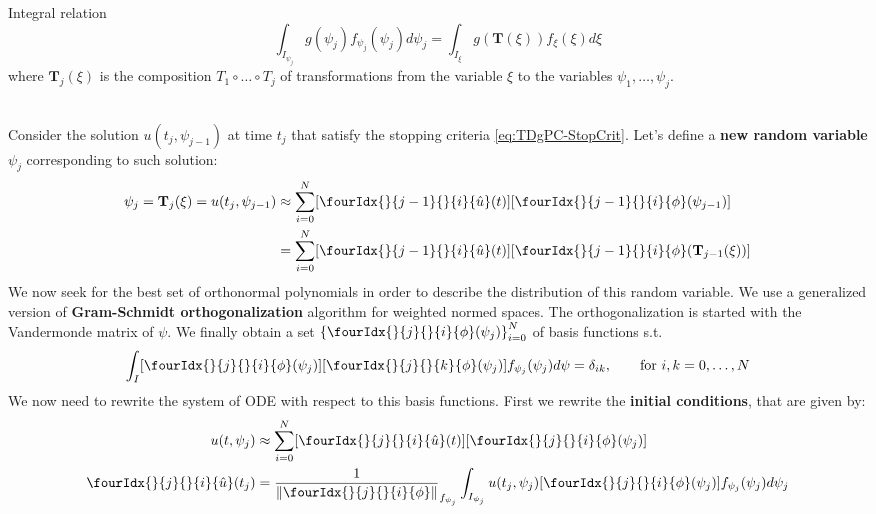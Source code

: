 \documentclass[a4paper,10pt]{article}
\begin{document}
Integral relation
\begin{equation}\label{eq:TDgPC-IntegralRelation}
	\int_{I_{\psi_j}} g(\psi_j)f_{\psi_j}(\psi_j) d\psi_j = \int_{I_\xi} g(\mathbf{T}(\xi))f_\xi(\xi) d\xi
\end{equation}
where $ \mathbf{T}_j(\xi) $ is the composition $ T_1 \circ \dots \circ T_j $ of transformations from the variable $\xi$ to the variables $\psi_1,\dots,\psi_j$.

\begin{exa}
\mbox{}\\
Consider the solution $ u(t_j,\psi_{j-1}) $ at time $t_j$ that satisfy the stopping criteria \eqref{eq:TDgPC-StopCrit}. Let's define a \textbf{new random variable} $\psi_j$ corresponding to such solution:
\begin{align}
	\psi_j = \mathbf{T}_j(\xi) = u(t_j, \psi_{j-1}) &\approx \sum_{i=0}^N [\fourIdx{}{j-1}{}{i}{\hat{u}}(t)] [\fourIdx{}{j-1}{}{i}{\phi}(\psi_{j-1})] \\
	&= \sum_{i=0}^N [\fourIdx{}{j-1}{}{i}{\hat{u}}(t)][\fourIdx{}{j-1}{}{i}{\phi}(\mathbf{T}_{j-1}(\xi))] \notag
\end{align}
We now seek for the best set of orthonormal polynomials in order to describe the distribution of this random variable. We use a generalized version of \textbf{Gram-Schmidt orthogonalization} algorithm \cite{stoer_introduction_2002} for weighted normed spaces. The orthogonalization is started with the Vandermonde matrix of $ \psi $. We finally obtain a set $ \left\lbrace \fourIdx{}{j}{}{i}{\phi}(\psi_j) \right\rbrace_{i=0}^N $ of basis functions s.t.
\begin{equation}
	\int_I [\fourIdx{}{j}{}{i}{\phi}(\psi_j)] [\fourIdx{}{j}{}{k}{\phi}(\psi_j)] f_{\psi_j}(\psi_j) d\psi = \delta_{ik}, \qquad \text{for $ i,k = 0, \dots, N $}
\end{equation}
We now need to rewrite the system of ODE with respect to this basis functions. First we rewrite the \textbf{initial conditions}, that are given by:
\begin{align}
	u(t,\psi_j) &\approx \sum_{i=0}^N [\fourIdx{}{j}{}{i}{\hat{u}}(t)] [\fourIdx{}{j}{}{i}{\phi}(\psi_{j})] \label{eq:TDgPC-newExpansion} \\
	\fourIdx{}{j}{}{i}{\hat{u}}(t_j) &= \frac{1}{\Vert \fourIdx{}{j}{}{i}{\phi} \Vert}_{f_{\psi_j}} \int_{I_{\psi_j}} u(t_j,\psi_j) [\fourIdx{}{j}{}{i}{\phi}(\psi_{j})] f_{\psi_j}(\psi_j) d\psi_j \\

\end{align}
\end{exa}
\end{document}

